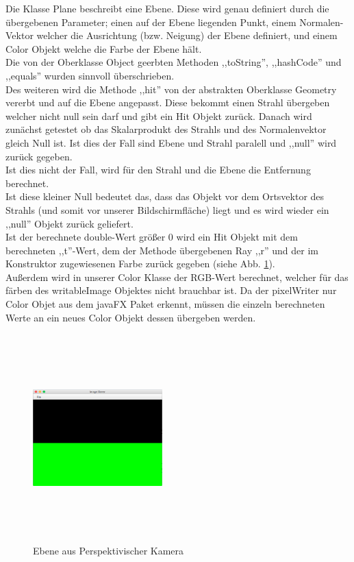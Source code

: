 \documentclass[14pt]{extarticle}
\begin{document}
Die Klasse Plane beschreibt eine Ebene. Diese wird genau definiert durch die übergebenen Parameter; einen auf der Ebene liegenden Punkt, einem Normalen-Vektor welcher die Ausrichtung (bzw. Neigung) der Ebene definiert, und einem Color Objekt welche die Farbe der Ebene hält. \\
Die von der Oberklasse Object geerbten Methoden ,,toString'', ,,hashCode'' und ,,equals'' wurden sinnvoll überschrieben.\\
Des weiteren wird die Methode ,,hit'' von der abstrakten Oberklasse Geometry vererbt und auf die Ebene angepasst. Diese bekommt einen Strahl übergeben welcher nicht null sein darf und gibt ein Hit Objekt zurück. Danach wird zunächst getestet ob das Skalarprodukt des Strahls und des Normalenvektor gleich Null ist. Ist dies der Fall sind Ebene und Strahl paralell und ,,null'' wird zurück gegeben. \\
Ist dies nicht der Fall, wird für den Strahl und die Ebene die Entfernung berechnet. \\
Ist diese kleiner Null bedeutet das, dass das Objekt vor dem Ortsvektor des Strahls (und somit vor unserer Bildschirmfläche) liegt und es wird wieder ein ,,null'' Objekt zurück geliefert. \\
Ist der berechnete double-Wert größer 0 wird ein Hit Objekt mit dem berechneten ,,t''-Wert, dem der Methode übergebenen Ray ,,r'' und der im Konstruktor zugewiesenen Farbe zurück gegeben (siehe Abb. \ref{Ebene}).\\
Außerdem wird in unserer Color Klasse der RGB-Wert berechnet, welcher für das färben des writableImage Objektes nicht brauchbar ist. Da der pixelWriter nur Color Objet aus dem javaFX Paket erkennt, müssen die einzeln berechneten Werte an ein neues Color Objekt dessen übergeben werden.
\begin{figure}[ht]
\begin{center}
\includegraphics[width=5cm, height=8cm]{TestCase1.png}
\caption{Ebene aus Perspektivischer Kamera}
\label{Ebene}
\end{center}
\end{figure}
\end{document}
